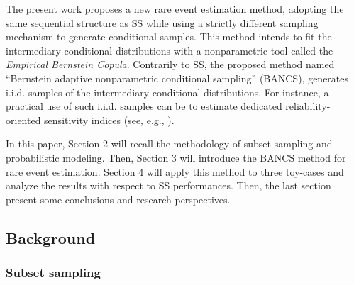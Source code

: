 The present work proposes a new rare event estimation method, adopting the same sequential structure as SS while using a strictly different sampling mechanism to generate conditional samples. 
This method intends to fit the intermediary conditional distributions with a nonparametric tool called the \emph{Empirical Bernstein Copula}. 
Contrarily to SS, the proposed method named ``Bernstein adaptive nonparametric conditional sampling'' (BANCS), generates i.i.d. samples of the intermediary conditional distributions. 
For instance, a practical use of such i.i.d. samples can be to estimate dedicated reliability-oriented sensitivity indices (see, e.g., \cite{chabridon2021global,marrel_chabridon_2021}).

In this paper, Section 2 will recall the methodology of subset sampling and probabilistic modeling. 
Then, Section 3 will introduce the BANCS method for rare event estimation. 
Section 4 will apply this method to three toy-cases and analyze the results with respect to SS performances. 
Then, the last section present some conclusions and research perspectives.


\subsection{Background}

\subsubsection{Subset sampling}


